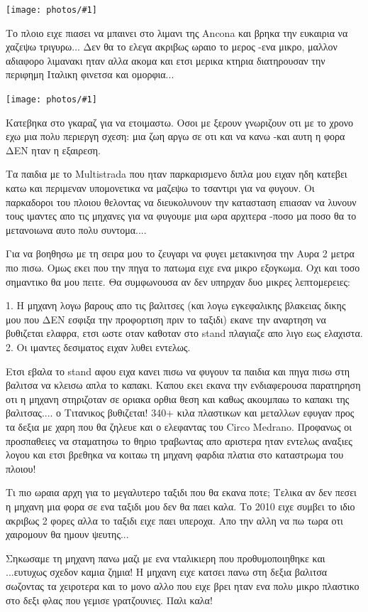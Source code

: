 \documentclass[11pt, letterpaper]{book}
\newcommand\photo[1]{\noindent\texttt{[image: photos/\#1]}}
\begin{document}
\photo{6.jpg}

Το πλοιο ειχε πιασει να μπαινει στο λιμανι της Ancona και βρηκα την ευκαιρια να χαζεψω τριγυρω...
Δεν θα το ελεγα ακριβως ωραιο το μερος -ενα μικρο, μαλλον αδιαφορο λιμανακι ηταν αλλα ακομα και ετσι μερικα κτηρια διατηρουσαν την περιφημη Ιταλικη φινετσα και ομορφια...

\photo{7.jpg}

Κατεβηκα στο γκαραζ για να ετοιμαστω. Οσοι με ξερουν γνωριζουν οτι με το χρονο εχω μια πολυ περιεργη σχεση: μια ζωη αργω σε οτι και να κανω -και αυτη η φορα ΔΕΝ ηταν η εξαιρεση.

Τα παιδια με το Multistrada που ηταν παρκαρισμενο διπλα μου ειχαν ηδη κατεβει κατω και περιμεναν υπομονετικα να μαζεψω το τσαντιρι για να φυγουν. Οι παρκαδοροι του πλοιου θελοντας να διευκολυνουν την κατασταση επιασαν να λυνουν τους ιμαντες απο τις μηχανες για να φυγουμε μια ωρα αρχιτερα -ποσο μα ποσο θα το μετανοιωνα αυτο πολυ συντομα....

Για να βοηθησω με τη σειρα μου το ζευγαρι να φυγει μετακινησα την Αυρα 2 μετρα πιο πισω. Ομως εκει που την πηγα το πατωμα ειχε ενα μικρο εξογκωμα. 
Οχι και τοσο σημαντικο θα μου πειτε. Θα συμφωνουσα αν δεν υπηρχαν δυο μικρες λεπτομερειες:

1. Η μηχανη λογω βαρους απο τις βαλιτσες (και λογω εγκεφαλικης βλακειας δικης μου που ΔΕΝ εσφιξα την προφορτιση πριν το ταξιδι) εκανε την αναρτηση να βυθιζεται ελαφρα, ετσι ωστε οταν καθοταν στο stand πλαγιαζε απο λιγο εως ελαχιστα.
2. Οι ιμαντες δεσιματος ειχαν λυθει εντελως.

Ετσι εβαλα το stand αφου ειχα κανει πισω να φυγουν τα παιδια και πηγα πισω στη βαλιτσα να κλεισω απλα το καπακι. Καπου εκει εκανα την ενδιαφερουσα παρατηρηση οτι η μηχανη στηριζοταν σε οριακα ορθια θεση και καθως ακουμπαω το καπακι της βαλιτσας.... ο Τιτανικος βυθιζεται!
340+ κιλα πλαστικων και μεταλλων εφυγαν προς τα δεξια με χαρη που θα ζηλευε και ο ελεφαντας του Circo Medrano. Προφανως οι προσπαθειες να σταματησω το θηριο τραβωντας απο αριστερα ηταν εντελως αναξιες λογου και ετσι βρεθηκα να κοιταω τη μηχανη φαρδια πλατια στο καταστρωμα του πλοιου!

Τι πιο ωραια αρχη για το μεγαλυτερο ταξιδι που θα εκανα ποτε; 
Τελικα αν δεν πεσει η μηχανη μια φορα σε ενα ταξιδι μου δεν θα παει καλα. Το 2010 ειχε συμβει το ιδιο ακριβως 2 φορες αλλα το ταξιδι ειχε παει υπεροχα. Απο την αλλη να πω τωρα οτι χαιρομουν θα ημουν ψευτης...

Σηκωσαμε τη μηχανη πανω μαζι με ενα νταλικιερη που προθυμοποιηθηκε και ...ευτυχως σχεδον καμια ζημια! Η μηχανη ειχε κατσει πανω στη δεξια βαλιτσα σωζοντας τα χειροτερα και το μονο αλλο που ειχε βρει ηταν ενα πολυ μικρο πλαστικο στο δεξι φλας που γεμισε γρατζουνιες. Παλι καλα!
\end{document}
